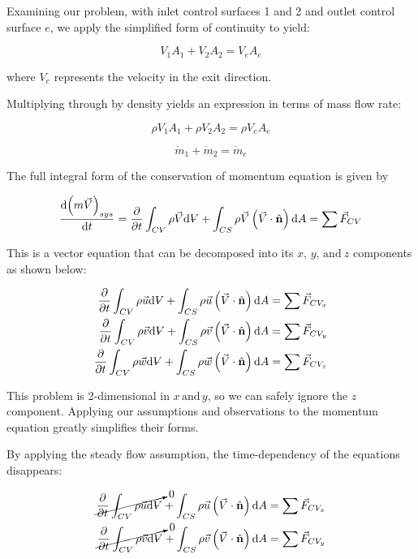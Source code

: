 \documentclass[../main.tex]{subfiles}
\begin{document}
Examining our problem, with inlet control surfaces 1 and 2 and outlet control surface $e$, we apply the simplified form of continuity to yield:

\[
    V_1 A_1 + V_2 A_2 = V_e A_e  
\]

where $V_e$ represents the velocity in the exit direction.

Multiplying through by density yields an expression in terms of mass flow rate:

\[
    \rho V_1 A_1 + \rho V_2 A_2 = \rho V_e A_e
\]

\[
    \dot{m}_1 + \dot{m}_2 = \dot{m}_e
\]

The full integral form of the conservation of momentum equation is given by

\begin{equation*}
    \frac{\dd (m\vec{V})_{sys}}{\dd t} = %
    \pdv{t} \int_{CV} \rho \vec{V} \dd \volume +%
    \int_{CS} \rho \vec{V} \left({\vec{V} \cdot \hat{\mathbf{n}}}\right) \dd A =%
    \sum{\vec{F}_{CV}}
\end{equation*}

This is a vector equation that can be decomposed into its \(x,\, y, \, \textrm{and} \ z\) components as shown below:

\begin{align*}
    \pdv{t} \int_{CV} \rho \vec{u} \dd \volume +%
    \int_{CS} \rho \vec{u} \left({\vec{V} \cdot \hat{\mathbf{n}}}\right) \dd A &=%
    \sum{\vec{F}_{CV_x}}\\
    \pdv{t} \int_{CV} \rho \vec{v} \dd \volume +%
    \int_{CS} \rho \vec{v} \left({\vec{V} \cdot \hat{\mathbf{n}}}\right) \dd A &=%
    \sum{\vec{F}_{CV_y}}\\
    \pdv{t} \int_{CV} \rho \vec{w} \dd \volume +%
    \int_{CS} \rho \vec{w} \left({\vec{V} \cdot \hat{\mathbf{n}}}\right) \dd A &=%
    \sum{\vec{F}_{CV_z}}
\end{align*}

This problem is 2-dimensional in \(x \, \textrm{and} \, y\), so we can safely ignore the \(z\) component.
Applying our assumptions and observations to the momentum equation greatly simplifies their forms. 
\par
By applying the steady flow assumption, the time-dependency of the equations disappears:

\begin{align*}
    \cancelto{0}{\pdv{t} \int_{CV} \rho \vec{u} \dd \volume} +%
    \int_{CS} \rho \vec{u} \left({\vec{V} \cdot \hat{\mathbf{n}}}\right) \dd A &=%
    \sum{\vec{F}_{CV_x}}\\
    \cancelto{0}{\pdv{t} \int_{CV} \rho \vec{v} \dd \volume} +%
    \int_{CS} \rho \vec{v} \left({\vec{V} \cdot \hat{\mathbf{n}}}\right) \dd A &=%
    \sum{\vec{F}_{CV_y}}
\end{align*}
\end{document}
